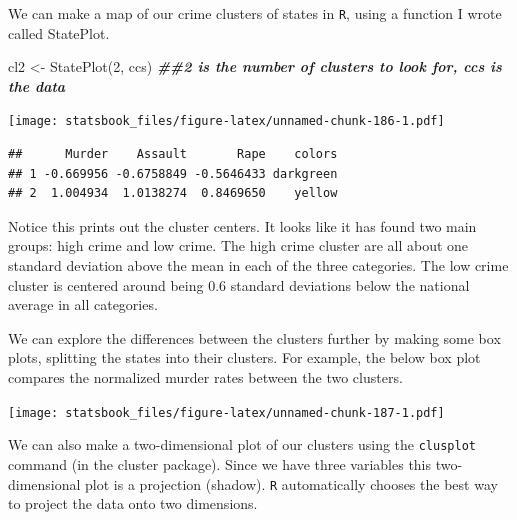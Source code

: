 \documentclass[
]{book}
\newenvironment{Shaded}{\begin{snugshade}}{\end{snugshade}}
\newcommand{\AttributeTok}[1]{\textcolor[rgb]{0.77,0.63,0.00}{#1}}
\newcommand{\DecValTok}[1]{\textcolor[rgb]{0.00,0.00,0.81}{#1}}
\newcommand{\DocumentationTok}[1]{\textcolor[rgb]{0.56,0.35,0.01}{\textbf{\textit{#1}}}}
\newcommand{\FunctionTok}[1]{\textcolor[rgb]{0.00,0.00,0.00}{#1}}
\newcommand{\NormalTok}[1]{#1}
\newcommand{\OtherTok}[1]{\textcolor[rgb]{0.56,0.35,0.01}{#1}}
\newcommand{\SpecialCharTok}[1]{\textcolor[rgb]{0.00,0.00,0.00}{#1}}
\newcommand{\StringTok}[1]{\textcolor[rgb]{0.31,0.60,0.02}{#1}}
\theoremstyle{definition}
\theoremstyle{definition}
\theoremstyle{definition}
\theoremstyle{definition}
\theoremstyle{remark}
\begin{document}
We can make a map of our crime clusters of states in \texttt{R}, using a function I wrote called StatePlot.

\begin{Shaded}
\begin{Highlighting}[]
\NormalTok{cl2 }\OtherTok{\textless{}{-}} \FunctionTok{StatePlot}\NormalTok{(}\DecValTok{2}\NormalTok{, ccs)  }\DocumentationTok{\#\#2 is the number of clusters to look for, ccs is the data}
\end{Highlighting}
\end{Shaded}

\texttt{[image: statsbook\_files/figure-latex/unnamed-chunk-186-1.pdf]}

\begin{verbatim}
##      Murder    Assault       Rape    colors
## 1 -0.669956 -0.6758849 -0.5646433 darkgreen
## 2  1.004934  1.0138274  0.8469650    yellow
\end{verbatim}

Notice this prints out the cluster centers. It looks like it has found two main groups: high crime and low crime. The high crime cluster are all about one standard deviation above the mean in each of the three categories. The low crime cluster is centered around being 0.6 standard deviations below the national average in all categories.

We can explore the differences between the clusters further by making some box plots, splitting the states into their clusters. For example, the below box plot compares the normalized murder rates between the two clusters.

\begin{Shaded}
\end{Shaded}

\texttt{[image: statsbook\_files/figure-latex/unnamed-chunk-187-1.pdf]}

We can also make a two-dimensional plot of our clusters using the \texttt{clusplot} command (in the cluster package). Since we have three variables this two-dimensional plot is a projection (shadow). \texttt{R} automatically chooses the best way to project the data onto two dimensions.
\end{document}
